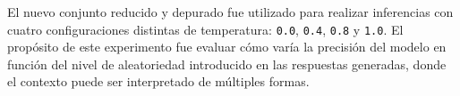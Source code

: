 El nuevo conjunto reducido y depurado fue utilizado para realizar inferencias con cuatro configuraciones distintas de temperatura: \texttt{0.0}, \texttt{0.4}, \texttt{0.8} y \texttt{1.0}. El propósito de este experimento fue evaluar cómo varía la precisión del modelo en función del nivel de aleatoriedad introducido en las respuestas generadas, donde el contexto puede ser interpretado de múltiples formas. 